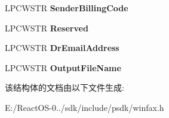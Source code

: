 \begin{DoxyCompactItemize}
\mbox{\label{struct___f_a_x___p_r_i_n_t___i_n_f_o_w_aac0a7593d9f2931b63691790c927b5a0}} 
L\+P\+C\+W\+S\+TR {\bfseries Sender\+Billing\+Code}
\item 
\mbox{\label{struct___f_a_x___p_r_i_n_t___i_n_f_o_w_ae371eb661671aa654eac3bc15621118e}} 
L\+P\+C\+W\+S\+TR {\bfseries Reserved}
\item 
\mbox{\label{struct___f_a_x___p_r_i_n_t___i_n_f_o_w_a5583a2002dda7942bd9978dde348e5f1}} 
L\+P\+C\+W\+S\+TR {\bfseries Dr\+Email\+Address}
\item 
\mbox{\label{struct___f_a_x___p_r_i_n_t___i_n_f_o_w_a460a117557e731df393a17e8fb0162aa}} 
L\+P\+C\+W\+S\+TR {\bfseries Output\+File\+Name}
\end{DoxyCompactItemize}


该结构体的文档由以下文件生成\+:\begin{DoxyCompactItemize}
\item 
E\+:/\+React\+O\+S-\/0../sdk/include/psdk/winfax.\+h\end{DoxyCompactItemize}
